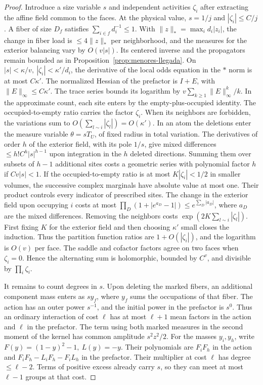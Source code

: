 \begin{proof}
Introduce a size variable \(s\) and independent activities \(\zeta_i\) after extracting the affine field
common to the faces. At the physical value, \(s=1/j\) and \(|\zeta_i|\le C/j\). A fiber of size \(D_f\)
satisfies \(\sum_{i\in f}d_i^{-1}\le1\). With \(\|z\|_*=\max_i d_i|z_i|\), the change in fiber load is
\(\le4\|z\|_*\) per neighborhood, and the measures for the exterior balancing vary by \(O(v|s|)\). Its
centered inverse and the propagators remain bounded as in Proposition~\ref{prop:menores-llegada}. On
\(|s|<\kappa/v,\ |\zeta_i|<\kappa'/d_i\), the derivative of the local odds equation in the \(*\) norm is
at most \(C\kappa'\). The normalized Hessian of the prefactor is \(I+E\), with \(\|E\|_\infty\le
C\kappa'\). The trace series bounds its logarithm by \(v\sum_{k\ge1}\|E\|_\infty^k/k\). In the
approximate count, each site enters by the empty-plus-occupied identity. The occupied-to-empty ratio
carries the factor \(\zeta_i\). When its neighbors are forbidden, the variations sum to \(O(\sum_{l\sim
i}|\zeta_l|)=O(\kappa')\). In an atom the deletions enter the measure variable \(\theta=sT_U\), of fixed
radius in total variation. The derivatives of order \(h\) of the exterior field, with its pole \(1/s\),
give mixed differences \(\le h! C^h|s|^{h-1}\) upon integration in the \(h\) deleted directions. Summing
them over subsets of \(h-1\) additional sites costs a geometric series with polynomial factor \(h\) if
\(Cv|s|<1\). If the occupied-to-empty ratio is at most \(K|\zeta_i|<1/2\) in smaller volumes, the
successive complex marginals have absolute value at most one. Their product controls every indicator of
prescribed sites. The change in the exterior field upon occupying \(i\) costs at most
\(\prod_D(1+|e^{a_D}-1|)\le e^{\sum_D|a_D|}\), where \(a_D\) are the mixed differences. Removing the
neighbors costs \(\exp(2K\sum_{l\sim i}|\zeta_l|)\). First fixing \(K\) for the exterior field and then
choosing \(\kappa'\) small closes the induction. Thus the partition function ratios are
\(1+O(|\zeta_i|)\), and the logarithm is \(O(v)\) per face. The saddle and cofactor factors agree on two
faces when \(\zeta_i=0\). Hence the alternating sum is holomorphic, bounded by \(C^v\), and divisible by
\(\prod_i\zeta_i\).

It remains to count degrees in \(s\). Upon deleting the marked fibers, an additional component mass
enters as \(s y_f\), where \(y_f\) sums the occupations of that fiber. The action has an outer power
\(s^{-1}\), and the initial power in the prefactor is \(s^0\). Thus an ordinary interaction of cost
\(\ell\) has at most \(\ell+1\) mean factors in the action and \(\ell\) in the prefactor. The term using
both marked measures in the second moment of the kernel has common amplitude \(s^2 z^2/2\). For the
masses \(y_i,y_h\), write \(F(y)=(1-y)^2-1,\ L(y)=-y\). Their polynomials are \(F_iF_h\) in the action
and \(F_iF_h-L_iF_h-F_iL_h\) in the prefactor. Their multiplier at cost \(\ell\) has degree
\(\le\ell-2\). Terms of positive excess already carry \(s\), so they can meet at most \(\ell-1\) groups
at that cost.


\end{proof}
